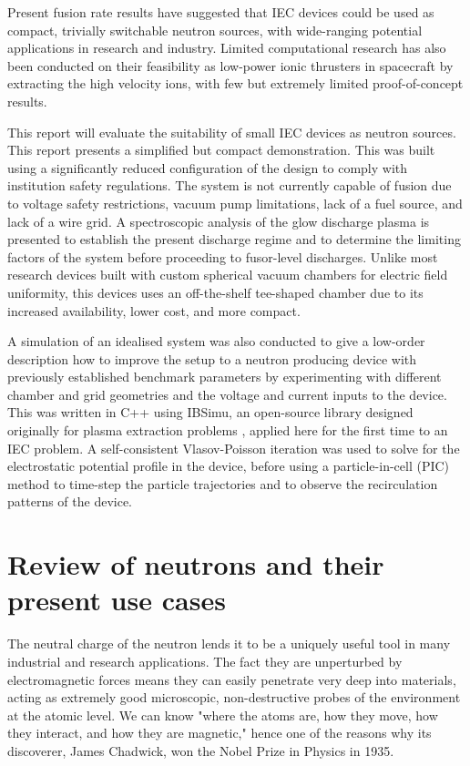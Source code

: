 \documentclass[a4paper,titlepage]{article}
\let\cite\parencite
\begin{document}
\begin{flushleft}
Present fusion rate results have suggested that IEC devices could be used as compact, trivially switchable neutron sources, with wide-ranging potential applications in research and industry. Limited computational research has also been conducted on their feasibility as low-power ionic thrusters in spacecraft by extracting the high velocity ions, with few but extremely limited proof-of-concept results. \cite{herdrich_2013_kinetic}\cite{chan_2018_breakthrough} \newline

This report will evaluate the suitability of small IEC devices as neutron sources. This report presents a simplified but compact demonstration. This was built using a significantly reduced configuration of the design to comply with institution safety regulations. The system is not currently capable of fusion due to voltage safety restrictions, vacuum pump limitations, lack of a fuel source, and lack of a wire grid. A spectroscopic analysis of the glow discharge plasma is presented to establish the present discharge regime and to determine the limiting factors of the system before proceeding to fusor-level discharges. Unlike most research devices built with custom spherical vacuum chambers for electric field uniformity, this devices uses an off-the-shelf tee-shaped chamber due to its increased availability, lower cost, and more compact. \newline

A simulation of an idealised system was also conducted to give a low-order description how to improve the setup to a neutron producing device with previously established benchmark parameters by experimenting with different chamber and grid geometries and the voltage and current inputs to the device. This was written in C++ using IBSimu, an open-source library designed originally for plasma extraction problems \cite{tkalvas_2010_scpibsimuscp}, applied here for the first time to an IEC problem. A self-consistent Vlasov-Poisson iteration was used to solve for the electrostatic potential profile in the device, before using a particle-in-cell (PIC) method to time-step the particle trajectories and to observe the recirculation patterns of the device. 

\section{Review of neutrons and their present use cases}

The neutral charge of the neutron lends it to be a uniquely useful tool in many industrial and research applications. The fact they are unperturbed by electromagnetic forces means they can easily penetrate very deep into materials, acting as extremely good microscopic, non-destructive probes of the environment at the atomic level.  We can know "where the atoms are, how they move, how they interact, and how they are magnetic," hence one of the reasons why its discoverer, James Chadwick, won the Nobel Prize in Physics in 1935. \cite{zakalek_2025_neutron} 


\end{flushleft}
\end{document}
